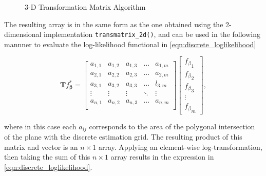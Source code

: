 \documentclass[a4paper,12pt]{article}
\newcommand{\bbeta}{{\boldsymbol{\beta}}}
\begin{document}
\begin{figure}[!htb]
\caption{3-D Transformation Matrix Algorithm} \label{fig:2d_Algo}
\end{figure}

The resulting array is in the same form as the one obtained using the 2-dimensional implementation \texttt{transmatrix\_2d()}, and can be used in the following mannner to evaluate the log-likelihood functional in \eqref{eqn:discrete_loglikelihood}

\begin{equation*}
	\textbf{T}f_\bbeta^{*} =
	\begin{bmatrix}
		a_{1,1} & a_{1,2} & a_{1,3} & \hdots & a_{1,m} \\
		a_{2,1} & a_{2,2} & a_{2,3} &\hdots & a_{2,m} \\
		a_{3,1} & a_{3,2} & a_{3,3} &\hdots & l_{3,m} \\
		\vdots & \vdots & \vdots & \ddots & \vdots \\
		a_{n,1} & a_{n,2} &a_{n,3} &\hdots & a_{n,m} \\
	\end{bmatrix} 
	\begin{bmatrix}
		{f_\beta}_1 \\
		{f_\beta}_2 \\
		{f_\beta}_3 \\
		\vdots      \\
		{f_\beta}_m
	\end{bmatrix},
\end{equation*}

where in this case each $a_{ij}$ corresponds to the area of the polygonal intersection of the plane with the discrete estimation grid. The resulting product of this matrix and vector is an $n \times 1$ array. Applying an element-wise log-transformation, then taking the sum of this $n \times 1$ array results in the expression in \eqref{eqn:discrete_loglikelihood}.
\end{document}

